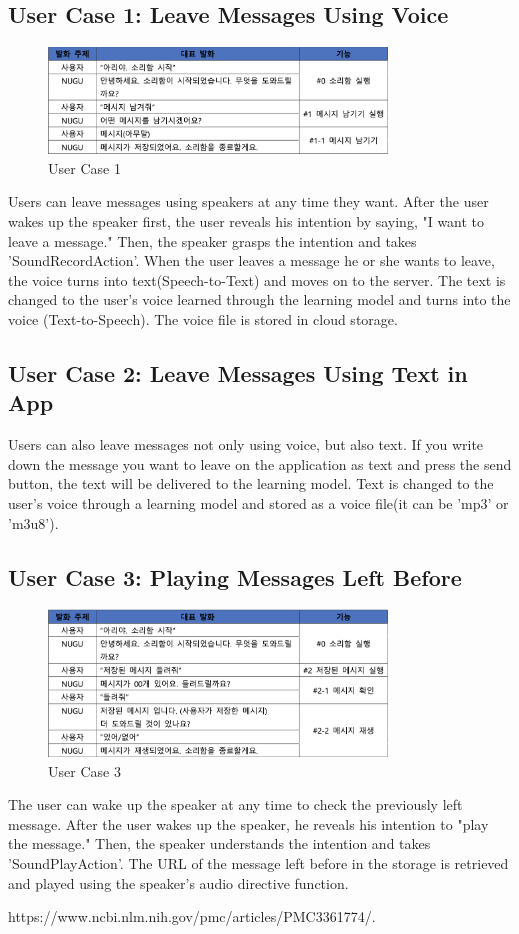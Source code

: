 \documentclass[conference]{IEEEtran}
\begin{document}
\subsection{User Case 1: Leave Messages Using Voice}
\begin{figure}[ht!]
    \centerline{\includegraphics[width=9cm]{img/usecase 1.png}}
    \caption{User Case 1}
\end{figure}
Users can leave messages using speakers at any time they want. After the user wakes up the speaker first, the user reveals his intention by saying, "I want to leave a message." Then, the speaker grasps the intention and takes 'SoundRecordAction'. When the user leaves a message he or she wants to leave, the voice turns into text(Speech-to-Text) and moves on to the server. The text is changed to the user's voice learned through the learning model and turns into the voice (Text-to-Speech). The voice file is stored in cloud storage.
\subsection{User Case 2: Leave Messages Using Text in App}
Users can also leave messages not only using voice, but also text. If you write down the message you want to leave on the application as text and press the send button, the text will be delivered to the learning model. Text is changed to the user's voice through a learning model and stored as a voice file(it can be 'mp3' or 'm3u8').
\subsection{User Case 3: Playing Messages Left Before}
\begin{figure}[ht!]
    \centerline{\includegraphics[width=9cm]{img/usecase 3.png}}
    \caption{User Case 3}
\end{figure}
The user can wake up the speaker at any time to check the previously left message. After the user wakes up the speaker, he reveals his intention to "play the message." Then, the speaker understands the intention and takes 'SoundPlayAction'. The URL of the message left before in the storage is retrieved and played using the speaker's audio directive function.

\begin{thebibliography}{00}
 https://www.ncbi.nlm.nih.gov/pmc/articles/PMC3361774/.
\end{thebibliography}
\vspace{12pt}
\end{document}

